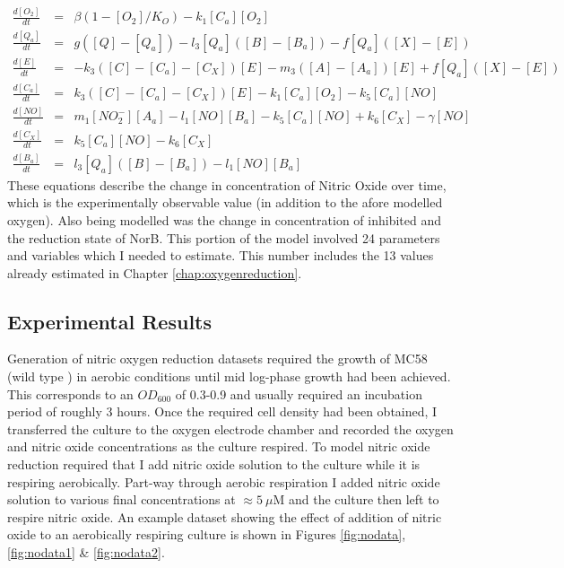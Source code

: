 \begin{eqnarray*}
\frac{d[O_2]}{dt} & = & \beta(1-[O_2]/K_O) - k_{1}[C_a][O_2]\\
\frac{d[Q_a]}{dt} & = & g([Q] - [Q_a]) - l_3[Q_a]([B] - [B_a]) - f[Q_a]([X]-[E])\\
\frac{d[E]}{dt} & = & -k_3([C] - [C_a] - [C_X])[E]  - m_3([A] - [A_a])[E] + f[Q_a]([X]-[E])\\
\frac{d[C_a]}{dt} & = & k_3([C] - [C_a] - [C_X])[E] - k_{1}[C_a][O_2] - k_5[C_a][NO]\\
\frac{d[NO]}{dt} & = & m_{1}[NO_2^-][A_a] - l_1[NO][B_a] - k_5[C_a][NO] + k_6 [C_X] - \gamma[NO]\\
\frac{d[C_X]}{dt} & = & k_5[C_a][NO] - k_6 [C_X]\\
\frac{d[B_a]}{dt} & = & l_3[Q_a]([B] - [B_a]) - l_1[NO][B_a]
\end{eqnarray*}
These equations describe the change in concentration of Nitric Oxide over time, which is the experimentally observable value (in addition to the afore modelled oxygen). Also being modelled was the change in concentration of inhibited \cbbthree{} and the reduction state of NorB. This portion of the model involved 24 parameters and variables which I needed to estimate. This number includes the 13 values already estimated in Chapter \ref{chap:oxygenreduction}.
\subsection{Experimental Results}
Generation of nitric oxygen reduction datasets required the growth of MC58 (wild type \Nsm{}) in aerobic conditions until mid log-phase growth had been achieved. This corresponds to an $OD_{600}$ of 0.3-0.9 and usually required an incubation period of roughly 3 hours. Once the required cell density had been obtained, I transferred the culture to the oxygen electrode chamber and recorded the oxygen and nitric oxide concentrations as the culture respired. To model nitric oxide reduction required that I add nitric oxide solution to the culture while it is respiring aerobically. Part-way through aerobic respiration I added nitric oxide solution to various final concentrations at $\approx 5~\mu$M and the culture then left to respire nitric oxide. An example dataset showing the effect of addition of nitric oxide to an aerobically respiring culture is shown in Figures \ref{fig:nodata}, \ref{fig:nodata1} \& \ref{fig:nodata2}.

